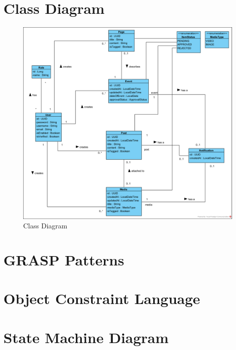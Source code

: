 \documentclass{article}
\begin{document}
\section{Class Diagram}
\begin{figure}[H]
    \centering
    \includegraphics[width=1.0\textwidth]{images/ClassDiagram.png}
    \centering
    \caption{Class Diagram}
\end{figure}
\section{GRASP Patterns}


\section{Object Constraint Language}


\section{State Machine Diagram}
\end{document}
